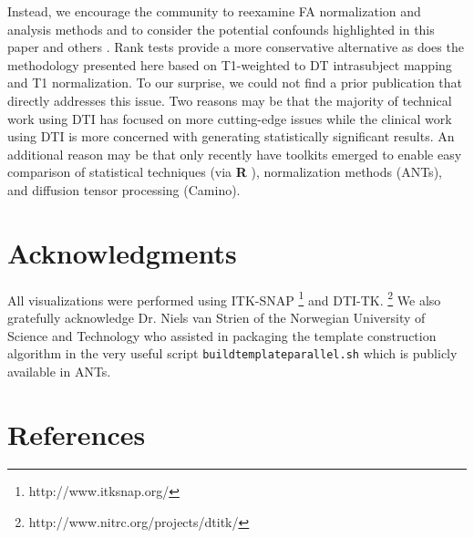 \documentclass[final,5p,times,twocolumn]{elsarticle}
\begin{document}
Instead, we encourage the community to
reexamine FA normalization and analysis methods and to consider the
potential confounds highlighted in this paper and others
\cite{Ridgway2008}.  Rank tests
provide a more conservative alternative as does the methodology
presented here based on T1-weighted to DT intrasubject mapping and T1
normalization.  To our surprise, we could not find a prior publication that directly
addresses this issue.  Two reasons may be that the majority of
technical work using DTI has focused on more cutting-edge issues while
the clinical work using DTI is more concerned with generating
statistically significant results.  An additional reason may be that
only recently have toolkits emerged to enable easy comparison of
statistical techniques (via {\bf R} \citep{RDevelopmentCoreTeam2011}), normalization methods (ANTs), and
diffusion tensor processing (Camino).






\section*{Acknowledgments}
All visualizations were performed using ITK-SNAP%
\footnote{
http://www.itksnap.org/
}
\citep{Yushkevich2006} and
DTI-TK.%
\footnote{
http://www.nitrc.org/projects/dtitk/
}
We also gratefully acknowledge Dr. Niels van Strien of the Norwegian University of Science and Technology
who assisted in packaging the template construction algorithm in the very useful script \verb#buildtemplateparallel.sh#
which is publicly available in ANTs.

\section*{References}










\end{document}
